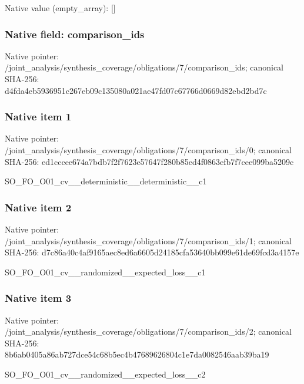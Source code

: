 \documentclass[10pt,a4paper]{article}
\begin{document}
Native value (empty\_\allowbreak{}array): []

\subsubsection{Native field: comparison\_\allowbreak{}ids}
Native pointer: /joint\_\allowbreak{}analysis/synthesis\_\allowbreak{}coverage/obligations/7/comparison\_\allowbreak{}ids; canonical SHA-256: d4fda4eb5936951c267eb09c135080a021ae47fd07c67766d0669d82ebd2bd7c

\subsubsection{Native item 1}
Native pointer: /joint\_\allowbreak{}analysis/synthesis\_\allowbreak{}coverage/obligations/7/comparison\_\allowbreak{}ids/0; canonical SHA-256: ed1cccee674a7bdb7f2f7623e57647f280b85ed4f0863efb7f7cee099ba5209c

\begingroup\raggedright\sloppy SO\_\allowbreak{}FO\_\allowbreak{}O01\_\allowbreak{}cv\_\allowbreak{}\_\allowbreak{}deterministic\_\allowbreak{}\_\allowbreak{}deterministic\_\allowbreak{}\_\allowbreak{}c1\par\endgroup

\subsubsection{Native item 2}
Native pointer: /joint\_\allowbreak{}analysis/synthesis\_\allowbreak{}coverage/obligations/7/comparison\_\allowbreak{}ids/1; canonical SHA-256: d7c86a40c4af9165aec8ed6a6605d24185cfa53640bb099e61de69fcd3a4157e

\begingroup\raggedright\sloppy SO\_\allowbreak{}FO\_\allowbreak{}O01\_\allowbreak{}cv\_\allowbreak{}\_\allowbreak{}randomized\_\allowbreak{}\_\allowbreak{}expected\_\allowbreak{}loss\_\allowbreak{}\_\allowbreak{}c1\par\endgroup

\subsubsection{Native item 3}
Native pointer: /joint\_\allowbreak{}analysis/synthesis\_\allowbreak{}coverage/obligations/7/comparison\_\allowbreak{}ids/2; canonical SHA-256: 8b6ab0405a86ab727dce54c68b5ec4b47689626804c1e7da0082546aab39ba19

\begingroup\raggedright\sloppy SO\_\allowbreak{}FO\_\allowbreak{}O01\_\allowbreak{}cv\_\allowbreak{}\_\allowbreak{}randomized\_\allowbreak{}\_\allowbreak{}expected\_\allowbreak{}loss\_\allowbreak{}\_\allowbreak{}c2\par\endgroup
\end{document}
